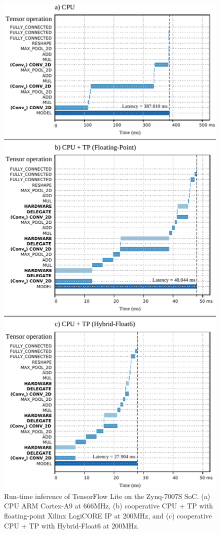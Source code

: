 \begin{figure}[t!]
	\centering
	\includegraphics[width=1\columnwidth]{../figures/runtime/runtime.pdf}
	\caption{Run-time inference of TensorFlow Lite on the Zynq-7007S SoC. (a) CPU ARM Cortex-A9 at 666MHz, (b) cooperative CPU + TP with floating-point Xilinx LogiCORE IP at 200MHz, and (c) cooperative CPU + TP with Hybrid-Float6 at 200MHz.}
	\label{fig:runtime}
\end{figure}

